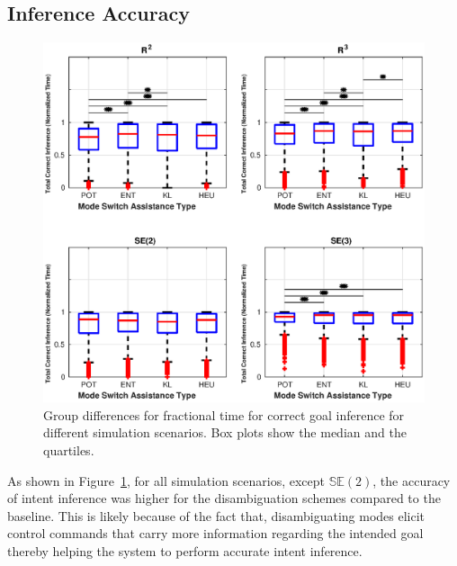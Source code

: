 \documentclass[conference]{IEEEtran}
\begin{document}
\subsection{Inference Accuracy}
\begin{figure}[t!]
	\centering
	\includegraphics[width= 1.\hsize, height=0.5\vsize]{./figures/correct_inference.eps}
	\vspace{-0.75cm}
	\caption{Group differences for fractional time for correct goal inference for different simulation scenarios. Box plots show the median and the quartiles.} 
	\label{fig:correct_inference}
\end{figure}
As shown in Figure~\ref{fig:correct_inference}, for all simulation scenarios, except $\mathbb{SE}(2)$, the accuracy of intent inference was higher for the disambiguation schemes compared to the baseline. This is likely because of the fact that, disambiguating modes elicit control commands that carry more information regarding the intended goal thereby helping the system to perform accurate intent inference. 
\end{document}
